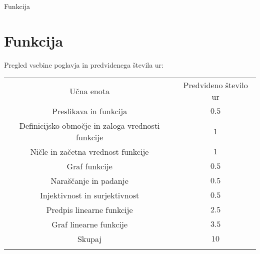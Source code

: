 \begin{priprava}{0}{}{}{Funkcija}{}{}
    
    \chapter{Funkcija}

    \Large{Pregled vsebine poglavja in predvidenega števila ur:}

    \begin{table}[H]
        \centering
        \begin{tabular}{||c|c||} 
        \hhline{|t:==:t|}
        \rowcolor[rgb]{0.843,0.718,0.718} 
        Učna enota  & Predvideno število ur   \\ 
        \hhline{|:==:|}
        Preslikava in funkcija & $0.5$    \\ 
        \hline
        Definicijsko območje in zaloga vrednosti funkcije & $1$    \\ 
        \hline
        Ničle in začetna vrednost funkcije & $1$    \\ 
        \hline
        Graf funkcije & $0.5$    \\
        \hline
        Naraščanje in padanje & $0.5$    \\
        \hline 
        Injektivnost in surjektivnost & $0.5$ \\
        \hline
        Predpis linearne funkcije & $2.5$    \\ 
        \hline
        Graf linearne funkcije & $3.5$    \\ 
        \hhline{|:==:|}
        Skupaj & $10$     \\
        \hhline{|b:==:b|}
        \end{tabular}
    \end{table}


    
\end{priprava}